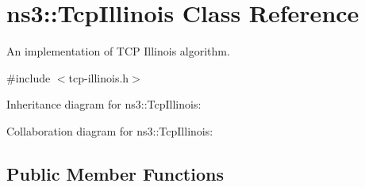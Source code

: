 \hypertarget{classns3_1_1TcpIllinois}{}\section{ns3\+:\+:Tcp\+Illinois Class Reference}
\label{classns3_1_1TcpIllinois}


An implementation of T\+CP Illinois algorithm.  




{\ttfamily \#include $<$tcp-\/illinois.\+h$>$}



Inheritance diagram for ns3\+:\+:Tcp\+Illinois\+:


Collaboration diagram for ns3\+:\+:Tcp\+Illinois\+:
\subsection*{Public Member Functions}
